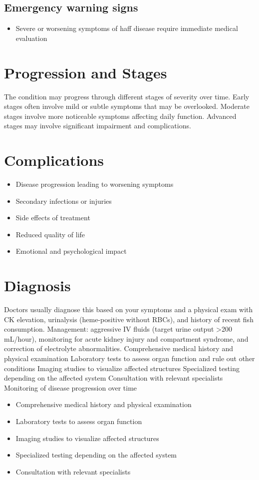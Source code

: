 \subsection{Emergency warning signs}
\begin{itemize}[noitemsep]
  \item Severe or worsening symptoms of haff disease require immediate medical evaluation
\end{itemize}
\section{Progression and Stages}
The condition may progress through different stages of severity over time. Early stages often involve mild or subtle symptoms that may be overlooked. Moderate stages involve more noticeable symptoms affecting daily function. Advanced stages may involve significant impairment and complications.
\section{Complications}
\begin{itemize}[noitemsep]
  \item Disease progression leading to worsening symptoms
  \item Secondary infections or injuries
  \item Side effects of treatment
  \item Reduced quality of life
  \item Emotional and psychological impact
\end{itemize}
\section{Diagnosis}
Doctors usually diagnose this based on your symptoms and a physical exam with CK elevation, urinalysis (heme-positive without RBCs), and history of recent fish consumption. Management: aggressive IV fluids (target urine output >200 mL/hour), monitoring for acute kidney injury and compartment syndrome, and correction of electrolyte abnormalities. Comprehensive medical history and physical examination Laboratory tests to assess organ function and rule out other conditions Imaging studies to visualize affected structures Specialized testing depending on the affected system Consultation with relevant specialists Monitoring of disease progression over time

\begin{itemize}[noitemsep]
  \item Comprehensive medical history and physical examination
  \item Laboratory tests to assess organ function
  \item Imaging studies to visualize affected structures
  \item Specialized testing depending on the affected system
  \item Consultation with relevant specialists
\end{itemize}
